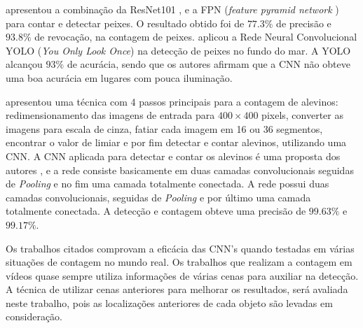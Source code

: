 \cite{ICESJournal} apresentou a combinação da ResNet101 \cite{ResNet50}, e a FPN (\textit{feature pyramid network} \cite{FPN}) para contar e detectar peixes. O resultado obtido foi de $77.3\%$ de precisão e $93.8\%$ de revocação, na contagem de peixes. \cite{YOLOFish} aplicou a Rede Neural Convolucional YOLO (\textit{You Only Look Once}) na detecção de peixes no fundo do mar. 
A YOLO alcançou $93\%$ de acurácia, sendo que os autores afirmam que a CNN não obteve uma boa acurácia em lugares com pouca iluminação. 

\cite{FingerLing} apresentou uma técnica com 4 passos principais para a contagem de alevinos: redimensionamento das imagens de entrada para $400\times400$ pixels, converter as imagens para escala de cinza, fatiar cada imagem em 16 ou 36 segmentos, encontrar o valor de limiar e por fim detectar e contar alevinos, utilizando uma CNN. A CNN aplicada para detectar e contar os alevinos é uma proposta dos autores \cite{FingerLing}, e a rede consiste basicamente em duas camadas convolucionais seguidas de \textit{Pooling} e no fim uma camada totalmente conectada.
A rede possui duas camadas convolucionais, seguidas de \textit{Pooling} e por último uma camada totalmente conectada. 
A detecção e contagem obteve uma precisão de $99.63\%$ e $99.17\%$. 



Os trabalhos citados comprovam a eficácia das CNN's quando testadas em várias situações de contagem no mundo real. Os trabalhos que realizam a contagem em vídeos quase sempre utiliza informações de várias cenas para auxiliar na detecção. A técnica de utilizar cenas anteriores para melhorar os resultados, será avaliada neste trabalho, pois as localizações anteriores de cada objeto são levadas em consideração.

